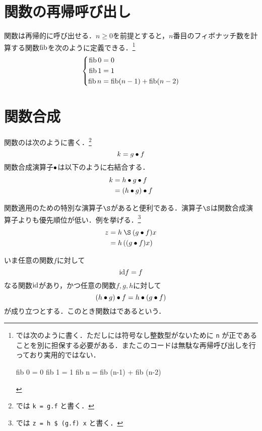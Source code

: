 \documentclass[platex,a5paper,twoside,fleqn,draft]{jsbook}
\newcommand{\keyword}[1]{\textgt{#1}}
\begin{document}
\section{関数の再帰呼び出し}

関数は再帰的に呼び出せる．$n\ge0$を前提とすると，$n$番目のフィボナッチ数を計算する関数$\mathop{\mathrm{fib}}$を次のように定義できる．\footnote{\haskell では次のように書く．ただし\haskell には符号なし整数型がないために \verb|n| が正であることを別に担保する必要がある．またこのコードは無駄な再帰呼び出しを行っており実用的ではない．
\begin{footcode}
      fib 0 = 0
      fib 1 = 1
      fib n = fib (n-1) + fib (n-2)
\end{footcode}}
\begin{equation}
\left\{
\begin{aligned}
\mathop{\mathrm{fib}} 0&=0\\
\mathop{\mathrm{fib}} 1&=1\\
\mathop{\mathrm{fib}} n&=\mathop{\mathrm{fib}}(n-1)+\mathop{\mathrm{fib}}(n-2)
\end{aligned}
\right.
\end{equation}

\section{関数合成}

関数の\keyword{合成}は次のように書く．\footnote{\haskell では \verb|k = g.f| と書く．}
\begin{equation}
k=g\mathbin{\bullet} f
\end{equation}
関数合成演算子$\mathbin{\bullet}$は以下のように右結合する．
\begin{align}
k&=h\mathbin{\bullet} g\mathbin{\bullet} f\\
&=\left(h\mathbin{\bullet} g\right)\mathbin{\bullet} f\\
\end{align}

関数適用のための特別な演算子$\mathApply$があると便利である．演算子$\mathApply$は関数合成演算子よりも優先順位が低い．例を挙げる．\footnote{\haskell では \verb|z = h $ (g.f) x| と書く．}
\begin{align}
z&=h\mathApply(g\mathCompose f)x\\
&=h\left((g\mathCompose f)x\right)
\end{align}

いま任意の関数$f$に対して
\begin{equation}
\mathord{\mathrm{id}} f=f
\end{equation}
なる関数$\mathord{\mathrm{id}}$があり，かつ任意の関数$f,g,h$に対して
\begin{equation}
(h\mathbin{\bullet} g)\mathbin{\bullet} f=h\mathbin{\bullet}(g\mathbin{\bullet} f)
\end{equation}
が成り立つとする．このとき関数は\keyword{モノイド}であるという．
\end{document}
